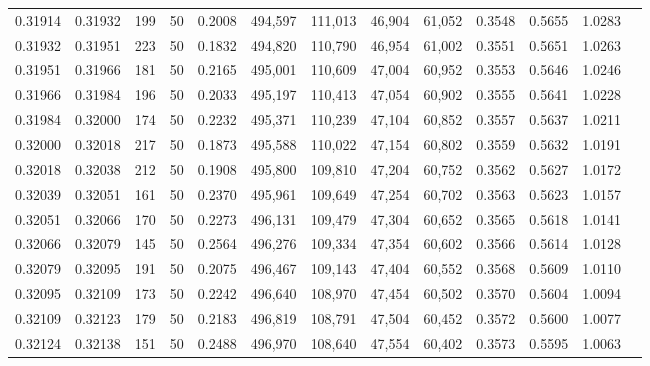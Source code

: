 \begin{tabular}{rrrrrrrrrrrrr}
0.31914 & 0.31932 &   199 &  50 &                                     0.2008 & 494,597 & 111,013 &  46,904 &  61,052 & 0.3548 & 0.5655 & 1.0283 \\
0.31932 & 0.31951 &   223 &  50 &                                     0.1832 & 494,820 & 110,790 &  46,954 &  61,002 & 0.3551 & 0.5651 & 1.0263 \\
0.31951 & 0.31966 &   181 &  50 &                                     0.2165 & 495,001 & 110,609 &  47,004 &  60,952 & 0.3553 & 0.5646 & 1.0246 \\
0.31966 & 0.31984 &   196 &  50 &                                     0.2033 & 495,197 & 110,413 &  47,054 &  60,902 & 0.3555 & 0.5641 & 1.0228 \\
0.31984 & 0.32000 &   174 &  50 &                                     0.2232 & 495,371 & 110,239 &  47,104 &  60,852 & 0.3557 & 0.5637 & 1.0211 \\
0.32000 & 0.32018 &   217 &  50 &                                     0.1873 & 495,588 & 110,022 &  47,154 &  60,802 & 0.3559 & 0.5632 & 1.0191 \\
0.32018 & 0.32038 &   212 &  50 &                                     0.1908 & 495,800 & 109,810 &  47,204 &  60,752 & 0.3562 & 0.5627 & 1.0172 \\
0.32039 & 0.32051 &   161 &  50 &                                     0.2370 & 495,961 & 109,649 &  47,254 &  60,702 & 0.3563 & 0.5623 & 1.0157 \\
0.32051 & 0.32066 &   170 &  50 &                                     0.2273 & 496,131 & 109,479 &  47,304 &  60,652 & 0.3565 & 0.5618 & 1.0141 \\
0.32066 & 0.32079 &   145 &  50 &                                     0.2564 & 496,276 & 109,334 &  47,354 &  60,602 & 0.3566 & 0.5614 & 1.0128 \\
0.32079 & 0.32095 &   191 &  50 &                                     0.2075 & 496,467 & 109,143 &  47,404 &  60,552 & 0.3568 & 0.5609 & 1.0110 \\
0.32095 & 0.32109 &   173 &  50 &                                     0.2242 & 496,640 & 108,970 &  47,454 &  60,502 & 0.3570 & 0.5604 & 1.0094 \\
0.32109 & 0.32123 &   179 &  50 &                                     0.2183 & 496,819 & 108,791 &  47,504 &  60,452 & 0.3572 & 0.5600 & 1.0077 \\
0.32124 & 0.32138 &   151 &  50 &                                     0.2488 & 496,970 & 108,640 &  47,554 &  60,402 & 0.3573 & 0.5595 & 1.0063 \\

\end{tabular}
